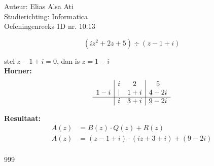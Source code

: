 \documentclass[a4paper]{article}
\begin{document}
\noindent \large Auteur: Elias Alsa Ati                         \\
\noindent \large Studierichting: Informatica                    \\
\noindent \large Oefeningenreeks 1D nr. 10.13    \\

\medskip

\normalsize

$$\left(iz^2 + 2z + 5\right) \div \left(z- 1 + i\right)$$

stel $z - 1 + i = 0$, dan is $z = 1 - i$\\

\textbf{Horner:}\\

$$\begin{array}{r|cc|c}
      & i & 2     & 5       \\  
1 - i & | & 1 + i & 4 - 2i  \\  \cline{1-4}
      & i & 3 + i & 9 - 2i
\end{array}$$

\textbf{Resultaat:}\\

\begin{align*}
    A(z) &= B(z) \cdot Q(z) + R(z)                                                      \\
    A(z) &= \left(z- 1 + i\right) \cdot \left(iz + 3 + i\right) + \left(9 - 2i\right)   \\
\end{align*}


\begin{thebibliography}{999}
\end{thebibliography}
\end{document}
